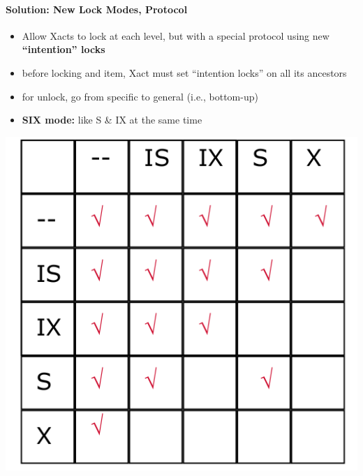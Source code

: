 \paragraph{Solution: New Lock Modes, Protocol}

\begin{minipage}{0.3\textwidth}
  \begin{itemize}
  \item Allow Xacts to lock at each level, but with a
    special protocol using new \textbf{``intention'' locks}
  \item before locking and item, Xact must set ``intention locks''
    on all its ancestors
  \item for unlock, go from specific to general
    (i.e., bottom-up)
  \item \textbf{SIX mode:} like S \& IX at the same time
  \end{itemize}
\end{minipage}%
\begin{minipage}{0.5\textwidth}
  \includegraphics[scale=0.15]{graphics/intention-locks.png}
\end{minipage}


